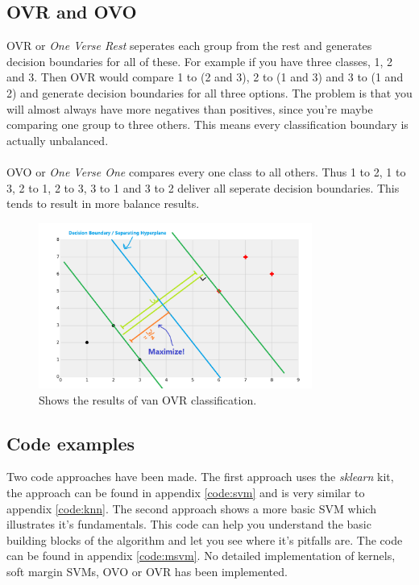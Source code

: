 
\subsection{OVR and OVO}\label{sub:ovr_ovo}
OVR or \emph{One Verse Rest} seperates each group from the rest and generates decision boundaries for all of these. For example if you have three classes, 1, 2 and 3. Then OVR would compare 1 to (2 and 3), 2 to (1 and 3) and 3 to (1 and 2) and generate decision boundaries for all three options. The problem is that you will almost always have more negatives than positives, since you're maybe comparing one group to three others. This means every classification boundary is actually unbalanced.
\\\\
OVO or \emph{One Verse One} compares every one class to all others. Thus 1 to 2, 1 to 3, 2 to 1, 2 to 3, 3 to 1 and 3 to 2 deliver all seperate decision boundaries. This tends to result in more balance results.

\begin{figure}
\centering
\includegraphics[width=0.8\textwidth]{images/svm-decision-boundary.png}
\caption{\label{fig:ovr} Shows the results of van OVR classification.}
\end{figure}

\subsection{Code examples}
Two code approaches have been made. The first approach uses the \emph{sklearn} kit, the approach can be found in appendix \ref{code:svm} and is very similar to appendix \ref{code:knn}. The second approach shows a more basic SVM which illustrates it's fundamentals. This code can help you understand the basic building blocks of the algorithm and let you see where it's pitfalls are. The code can be found in appendix \ref{code:msvm}. No detailed implementation of kernels, soft margin SVMs, OVO or OVR has been implemented.

